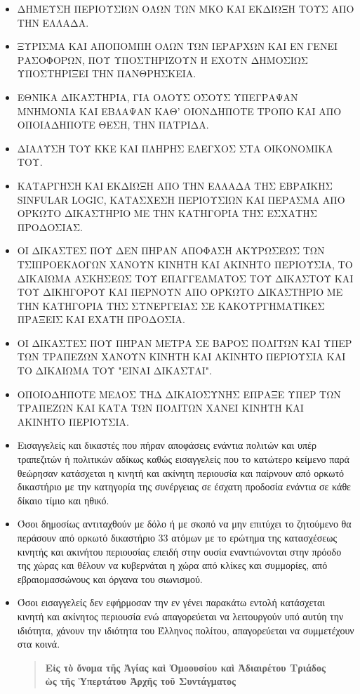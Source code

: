 \documentclass[a4paper]{article}
\begin{document}
\begin{itemize}
\item  ΔΗΜΕΥΣΗ ΠΕΡΙΟΥΣΙΩΝ ΟΛΩΝ ΤΩΝ ΜΚΟ ΚΑΙ ΕΚΔΙΩΞΗ ΤΟΥΣ ΑΠΟ ΤΗΝ ΕΛΛΑΔΑ.
\item  ΞΥΡΙΣΜΑ ΚΑΙ ΑΠΟΠΟΜΠΗ ΟΛΩΝ ΤΩΝ ΙΕΡΑΡΧΩΝ ΚΑΙ ΕΝ ΓΕΝΕΙ ΡΑΣΟΦΟΡΩΝ, ΠΟΥ ΥΠΟΣΤΗΡΙΖΟΥΝ Ή ΕΧΟΥΝ ΔΗΜΟΣΙΩΣ ΥΠΟΣΤΗΡΙΞΕΙ ΤΗΝ ΠΑΝΘΡΗΣΚΕΙΑ.
\item  ΕΘΝΙΚΑ ΔΙΚΑΣΤΗΡΙΑ, ΓΙΑ ΟΛΟΥΣ ΟΣΟΥΣ ΥΠΕΓΡΑΨΑΝ ΜΝΗΜΟΝΙΑ ΚΑΙ ΕΒΛΑΨΑΝ ΚΑΘ' ΟΙΟΝΔΗΠΟΤΕ ΤΡΟΠΟ ΚΑΙ ΑΠΟ ΟΠΟΙΑΔΗΠΟΤΕ ΘΕΣΗ, ΤΗΝ ΠΑΤΡΙΔΑ.
\item  ΔΙΑΛΥΣΗ ΤΟΥ ΚΚΕ ΚΑΙ ΠΛΗΡΗΣ ΕΛΕΓΧΟΣ ΣΤΑ ΟΙΚΟΝΟΜΙΚΑ ΤΟΥ.
\item  ΚΑΤΑΡΓΗΣΗ ΚΑΙ ΕΚΔΙΩΞΗ ΑΠΟ ΤΗΝ ΕΛΛΑΔΑ ΤΗΣ ΕΒΡΑΪΚΗΣ SINFULAR LOGIC, ΚΑΤΑΣΧΕΣΗ ΠΕΡΙΟΥΣΙΩΝ ΚΑΙ ΠΕΡΑΣΜΑ ΑΠΟ ΟΡΚΩΤΟ ΔΙΚΑΣΤΗΡΙΟ ΜΕ ΤΗΝ ΚΑΤΗΓΟΡΙΑ ΤΗΣ ΕΣΧΑΤΗΣ ΠΡΟΔΟΣΙΑΣ.
\item  ΟΙ ΔΙΚΑΣΤΕΣ ΠΟΥ ΔΕΝ ΠΗΡΑΝ ΑΠΟΦΑΣΗ ΑΚΥΡΩΣΕΩΣ ΤΩΝ ΤΣΙΠΡΟΕΚΛΟΓΩΝ ΧΑΝΟΥΝ ΚΙΝΗΤΗ ΚΑΙ ΑΚΙΝΗΤΟ ΠΕΡΙΟΥΣΙΑ, ΤΟ ΔΙΚΑΙΩΜΑ ΑΣΚΗΣΕΩΣ ΤΟΥ ΕΠΑΓΓΕΛΜΑΤΟΣ ΤΟΥ ΔΙΚΑΣΤΟΥ ΚΑΙ ΤΟΥ ΔΙΚΗΓΟΡΟΥ ΚΑΙ ΠΕΡΝΟΥΝ ΑΠΟ ΟΡΚΩΤΟ ΔΙΚΑΣΤΗΡΙΟ ΜΕ ΤΗΝ ΚΑΤΗΓΟΡΙΑ ΤΗΣ ΣΥΝΕΡΓΕΙΑΣ ΣΕ ΚΑΚΟΥΡΓΗΜΑΤΙΚΕΣ ΠΡΑΞΕΙΣ ΚΑΙ ΕΧΑΤΗ ΠΡΟΔΟΣΙΑ.
\item  ΟΙ ΔΙΚΑΣΤΕΣ ΠΟΥ ΠΉΡΑΝ ΜΕΤΡΑ ΣΕ ΒΑΡΟΣ ΠΟΛΙΤΩΝ ΚΑΙ ΥΠΕΡ ΤΩΝ ΤΡΑΠΕΖΩΝ ΧΑΝΟΥΝ ΚΙΝΗΤΗ ΚΑΙ ΑΚΙΝΗΤΟ ΠΕΡΙΟΥΣΙΑ ΚΑΙ ΤΟ ΔΙΚΑΙΩΜΑ ΤΟΥ "ΕΙΝΑΙ ΔΙΚΑΣΤΑΙ".
\item  ΟΠΟΙΟΔΗΠΟΤΕ ΜΕΛΟΣ ΤΗΔ ΔΙΚΑΙΟΣΥΝΗΣ ΕΠΡΑΞΕ ΥΠΕΡ ΤΩΝ ΤΡΑΠΕΖΩΝ ΚΑΙ ΚΑΤΑ ΤΩΝ ΠΟΛΙΤΩΝ ΧΑΝΕΙ ΚΙΝΗΤΗ ΚΑΙ ΑΚΙΝΗΤΟ ΠΕΡΙΟΥΣΙΑ.
\item  Εισαγγελείς και δικαστές που πήραν αποφάσεις ενάντια πολιτών και υπέρ τραπεζιτών ή πολιτικών αδίκως καθώς εισαγγελείς που το κατώτερο κείμενο παρά θεώρησαν κατάσχεται η κινητή και ακίνητη περιουσία και παίρνουν από ορκωτό δικαστήριο με την κατηγορία της συνέργειας σε έσχατη προδοσία ενάντια σε κάθε δίκαιο τίμιο και ηθικό.
\item  Όσοι δημοσίως αντιταχθούν με δόλο ή με σκοπό να μην επιτύχει το ζητούμενο θα περάσουν από ορκωτό δικαστήριο 33 ατόμων με το ερώτημα της κατασχέσεως κινητής και ακινήτου περιουσίας επειδή στην ουσία εναντιώνονται στην πρόοδο της χώρας και θέλουν να κυβερνάται η χώρα από κλίκες και συμμορίες, από εβραιομασσώνους και όργανα του σιωνισμού.
\item  Όσοι εισαγγελείς δεν εφήρμοσαν την εν γένει παρακάτω εντολή κατάσχεται κινητή και ακίνητος περιουσία ενώ απαγορεύεται να λειτουργούν υπό αυτύη την ιδιότητα, χάνουν την ιδιότητα του Έλληνος πολίτου, απαγορεύεται να συμμετέχουν στα κοινά.

\begin{quote}
	{\centering
	\textbf{Εἰς τὸ ὄνομα τῆς Ἁγίας καὶ Ὀμοουσίου καὶ Ἀδιαιρέτου Τριάδος \\ ὡς τῆς Ὑπερτάτου Ἀρχῆς τοῦ Συντάγματος}


}
\end{quote}
\end{itemize}
\end{document}
